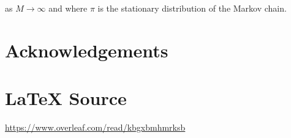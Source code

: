 \documentclass[11pt, oneside]{article}                          %
\begin{document}
\bigskip
\noindent
as $M \rightarrow \infty$ and where $\pi$ is the stationary
distribution of the Markov chain.
%
%
%
\section*{Acknowledgements}
%
%
\section*{\LaTeX \hspace{0.10 mm} Source}
\url{https://www.overleaf.com/read/kbgxbmhmrksb}
%
%
%


%
%
\end{document}
